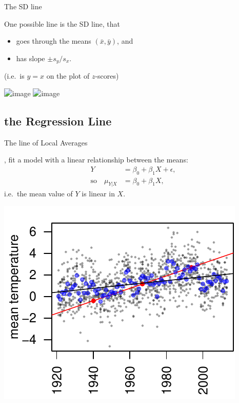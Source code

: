\begin{frame}{The SD line}

    One possible line is the \alert{SD line},
    that
    \begin{itemize}
        \item goes through the means $(\bar x, \bar y)$, and
        \item has slope $\pm s_y/s_x$.
    \end{itemize}
    (i.e.\ is $y=x$ on the plot of $z$-scores)

    \vspace{1em}

     

    \centering
    \includegraphics<1>{usc-temps-lines}
    \includegraphics<2>{usc-temps-lines-means}

\end{frame}

\subsection{the Regression Line}

\begin{frame}{The line of Local Averages}

    , fit a model with a \alert{linear relationship between the means}:
    \begin{align*}
        Y &= \beta_0 + \beta_1 X + \epsilon, \\
        \text{so} \quad \mu_{Y|X} &= \beta_0 + \beta_1 X ,
    \end{align*}
    i.e.\ the mean value of $Y$ is linear in $X$.
    

    \begin{center}
        \includegraphics{usc-temps-both-lines}
    \end{center}

\end{frame}


